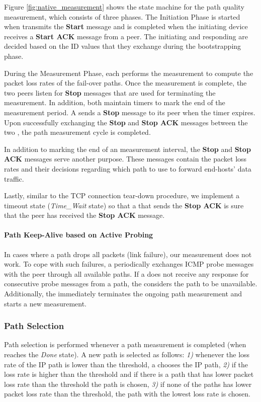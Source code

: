 Figure \ref{fig:native_measurement} shows the state machine for the path
quality measurement, which consists of three phases. The Initiation Phase is
started when \name transmits the \textbf{Start} message and is completed when
the initiating device receives a \textbf{Start ACK} message from a peer.  The
initiating and responding \names are decided based on the ID values that they
exchange during the bootstrapping phase.

During the Measurement Phase, each \name performs the measurement to compute
the packet loss rates of the fail-over paths.  Once the measurement is
complete, the two peers listen for \textbf{Stop} messages that are used for
terminating the measurement. In addition, both \names maintain timers to mark
the end of the measurement period. A \name sends a \textbf{Stop} message to its
peer when the timer expires. Upon successfully exchanging the \textbf{Stop} and
\textbf{Stop ACK} messages between the two \names, the path measurement cycle
is completed.

In addition to marking the end of an measurement interval, the \textbf{Stop}
and \textbf{Stop ACK} messages serve another purpose. These messages contain
the packet loss rates and their decisions regarding which path to use to
forward end-hosts' data traffic.

Lastly, similar to the TCP connection tear-down procedure, we implement a
timeout state (\ie \textit{Time\_Wait} state) so that a \name that sends the
\textbf{Stop ACK} is sure that the peer \name has received the \textbf{Stop
ACK} message.

\paragraph{Path Keep-Alive based on Active Probing} In cases where a path drops
all packets (\eg link failure), our measurement does not work. To cope with
such failures, a \name periodically exchanges ICMP probe messages with the peer
\name through all available paths. If a \name does not receive any response for
consecutive probe messages from a path, the \name considers the path to be
unavailable. Additionally, the \name immediately terminates the ongoing path
measurement and starts a new measurement.

\subsubsection {Path Selection}

Path selection is performed whenever a path measurement is completed (when
\name reaches the \textit{Done} state). A new path is selected as follows:
\textit{1)} whenever the loss rate of the IP path is lower than the threshold,
a \name chooses the IP path, \textit{2)} if the loss rate is higher than the
threshold and if there is a \scion path that has lower packet loss rate than
the threshold the \scion path is chosen, \textit{3)} if none of the paths has
lower packet loss rate than the threshold, the path with the lowest loss rate
is chosen.

